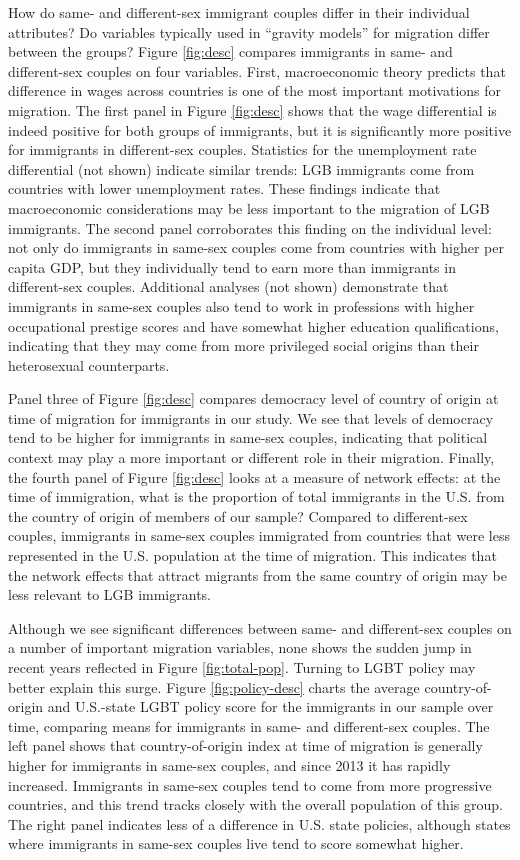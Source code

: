 \documentclass[
  11pt,
]{article}
\begin{document}
How do same- and different-sex immigrant couples differ in their individual attributes? Do variables typically used in ``gravity models'' for migration differ between the groups? Figure \ref{fig:desc} compares immigrants in same- and different-sex couples on four variables. First, macroeconomic theory predicts that difference in wages across countries is one of the most important motivations for migration. The first panel in Figure \ref{fig:desc} shows that the wage differential is indeed positive for both groups of immigrants, but it is significantly more positive for immigrants in different-sex couples. Statistics for the unemployment rate differential (not shown) indicate similar trends: LGB immigrants come from countries with lower unemployment rates. These findings indicate that macroeconomic considerations may be less important to the migration of LGB immigrants. The second panel corroborates this finding on the individual level: not only do immigrants in same-sex couples come from countries with higher per capita GDP, but they individually tend to earn more than immigrants in different-sex couples. Additional analyses (not shown) demonstrate that immigrants in same-sex couples also tend to work in professions with higher occupational prestige scores and have somewhat higher education qualifications, indicating that they may come from more privileged social origins than their heterosexual counterparts.

Panel three of Figure \ref{fig:desc} compares democracy level of country of origin at time of migration for immigrants in our study. We see that levels of democracy tend to be higher for immigrants in same-sex couples, indicating that political context may play a more important or different role in their migration. Finally, the fourth panel of Figure \ref{fig:desc} looks at a measure of network effects: at the time of immigration, what is the proportion of total immigrants in the U.S. from the country of origin of members of our sample? Compared to different-sex couples, immigrants in same-sex couples immigrated from countries that were less represented in the U.S. population at the time of migration. This indicates that the network effects that attract migrants from the same country of origin may be less relevant to LGB immigrants.

Although we see significant differences between same- and different-sex couples on a number of important migration variables, none shows the sudden jump in recent years reflected in Figure \ref{fig:total-pop}. Turning to LGBT policy may better explain this surge. Figure \ref{fig:policy-desc} charts the average country-of-origin and U.S.-state LGBT policy score for the immigrants in our sample over time, comparing means for immigrants in same- and different-sex couples. The left panel shows that country-of-origin index at time of migration is generally higher for immigrants in same-sex couples, and since 2013 it has rapidly increased. Immigrants in same-sex couples tend to come from more progressive countries, and this trend tracks closely with the overall population of this group. The right panel indicates less of a difference in U.S. state policies, although states where immigrants in same-sex couples live tend to score somewhat higher.
\end{document}
